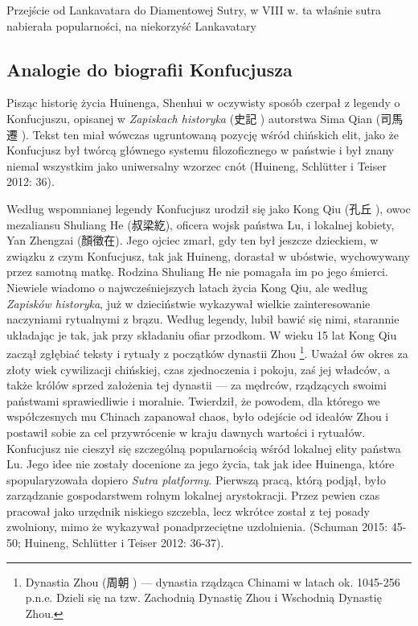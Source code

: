Przejście od Lankavatara do Diamentowej Sutry, w VIII w. ta właśnie sutra nabierała popularności, na niekorzyść Lankavatary
\fi
\subsection{Analogie do biografii Konfucjusza}
Pisząc historię życia Huinenga, Shenhui w oczywisty sposób czerpał z legendy o Konfucjuszu, opisanej w \textit{Zapiskach historyka} (史記 ) autorstwa Sima Qian (司馬遷 ). Tekst ten miał wówczas ugruntowaną pozycję wśród chińskich elit, jako że Konfucjusz był twórcą głównego systemu filozoficznego w państwie i był znany niemal wszystkim jako uniwersalny wzorzec cnót (Huineng, Schlütter i Teiser 2012: 36).

Według wspomnianej legendy Konfucjusz urodził się jako Kong Qiu (孔丘 ), owoc mezaliansu Shuliang He (叔梁紇), oficera wojsk państwa Lu, i lokalnej kobiety, Yan Zhengzai (顏徵在). Jego ojciec zmarł, gdy ten był jeszcze dzieckiem, w związku z czym Konfucjusz, tak jak Huineng, dorastał w ubóstwie, wychowywany przez samotną matkę. Rodzina Shuliang He nie pomagała im po jego śmierci. Niewiele wiadomo o najwcześniejszych latach życia Kong Qiu, ale według \textit{Zapisków historyka}, już w dzieciństwie wykazywał wielkie zainteresowanie naczyniami rytualnymi z brązu. Według legendy, lubił bawić się nimi, starannie układając je tak, jak przy składaniu ofiar przodkom. W wieku 15 lat Kong Qiu zaczął zgłębiać teksty i rytuały z początków dynastii Zhou%
\footnote{Dynastia Zhou (周朝 ) --- dynastia rządząca Chinami w latach ok. 1045-256 p.n.e. Dzieli się na tzw. Zachodnią Dynastię Zhou i Wschodnią Dynastię Zhou.}.
Uważał ów okres za złoty wiek cywilizacji chińskiej, czas zjednoczenia i pokoju, zaś jej władców, a także królów sprzed założenia tej dynastii --- za mędrców, rządzących swoimi państwami sprawiedliwie i moralnie.
Twierdził, że powodem, dla którego we współczesnych mu Chinach zapanował chaos, było odejście od ideałów Zhou i postawił sobie za cel przywrócenie w kraju dawnych wartości i rytuałów.
Konfucjusz nie cieszył się szczególną popularnością wśród lokalnej elity państwa Lu.
Jego idee nie zostały docenione za jego życia, tak jak idee Huinenga, które spopularyzowała dopiero \textit{Sutra platformy}.
Pierwszą pracą, którą podjął, było zarządzanie gospodarstwem rolnym lokalnej arystokracji.
Przez pewien czas pracował jako urzędnik niskiego szczebla, lecz wkrótce został z tej posady zwolniony, mimo że wykazywał ponadprzeciętne uzdolnienia.
(Schuman 2015: 45-50; Huineng, Schlütter i Teiser 2012: 36-37).

